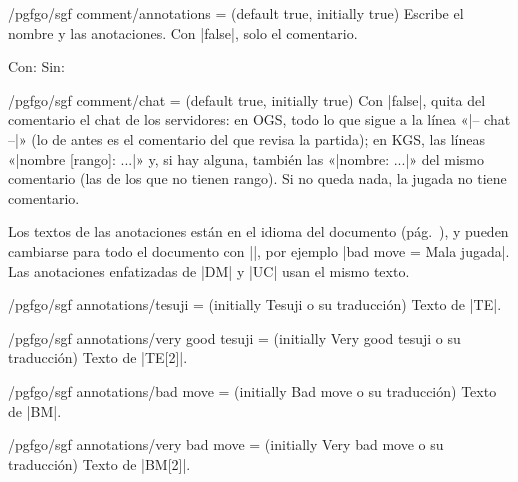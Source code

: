 \begin{key}{/pgfgo/sgf comment/annotations =  (default true, initially true)}
	Escribe el nombre y las anotaciones. Con |false|, solo el comentario.

	\begin{codeexample}[]
		Con: 
		\quad Sin: 
	\end{codeexample}
\end{key}

\begin{key}{/pgfgo/sgf comment/chat =  (default true, initially true)}
	Con |false|, quita del comentario el chat de los servidores: en OGS, todo lo que sigue a la línea «|-- chat --|» (lo de antes es el comentario del que revisa la partida); en KGS, las líneas «|nombre [rango]: ...|» y, si hay alguna, también las «|nombre: ...|» del mismo comentario (las de los que no tienen rango). Si no queda nada, la jugada no tiene comentario.
\end{key}

Los textos de las anotaciones están en el idioma del documento (pág.~\pageref{subsec:idiomas}), y pueden cambiarse para todo el documento con ||, por ejemplo |bad move = Mala jugada|. Las anotaciones enfatizadas de |DM| y |UC| usan el mismo texto.

\begin{key}{/pgfgo/sgf annotations/tesuji =  (initially Tesuji o su traducción)}
	Texto de |TE|.

	\begin{codeexample}[]
	\end{codeexample}
\end{key}

\begin{key}{/pgfgo/sgf annotations/very good tesuji =  (initially Very good tesuji o su traducción)}
	Texto de |TE[2]|.
\end{key}

\begin{key}{/pgfgo/sgf annotations/bad move =  (initially Bad move o su traducción)}
	Texto de |BM|.
\end{key}

\begin{key}{/pgfgo/sgf annotations/very bad move =  (initially Very bad move o su traducción)}
	Texto de |BM[2]|.
\end{key}


